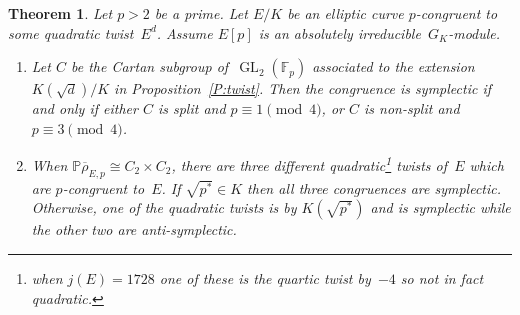 \documentclass[12pt, reqno]{amsart}
\newcommand{\F}{\mathbb{F}}
\newcommand{\PP}{\mathbb{P}}
\newcommand{\rhobar}{{\overline{\rho}}}
\newcommand{\GL}{\operatorname{GL}}
\numberwithin{equation}{section}
\newtheorem{theorem}{Theorem}[section]
\theoremstyle{definition}
\theoremstyle{remark}
\begin{document}
\begin{theorem}\label{T:quadratic} 
Let $p > 2$ be a prime. 
Let $E/K$ be an elliptic curve 
$p$-congruent to some quadratic twist~$E^d$.
Assume $E[p]$ is an absolutely irreducible~$G_K$-module.

\begin{enumerate}

\item Let $C$ be the Cartan subgroup of~$\GL_2(\F_p)$
  associated to the extension $K(\sqrt{d})/K$ in
  Proposition~\ref{P:twist}.  Then the congruence is symplectic if and
  only if \emph{either} $C$ is split and $p \equiv 1 \pmod{4}$,
  \emph{or} $C$ is non-split and $p \equiv 3 \pmod{4}$.

\item When $\PP\rhobar_{E,p}\cong C_2\times C_2$, there are three
  different quadratic\footnote{when $j(E)=1728$ one of these
    is the quartic twist by~$-4$ so not in fact quadratic.}  twists
    of~$E$ which are $p$-congruent to~$E$.  If $\sqrt{p^*}\in K$ then
    all three congruences are symplectic.  Otherwise, one of the
    quadratic twists is by $K(\sqrt{p^*})$ and is symplectic while the
    other two are anti-symplectic.
\end{enumerate}
\end{theorem}
\end{document}
